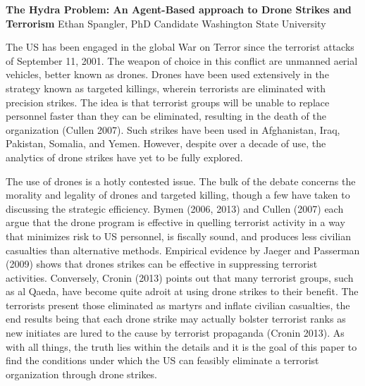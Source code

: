 \documentclass[12pt,letter,draft]{article}
\begin{document}
\clearpage
\thispagestyle{empty}

\noindent \textbf {The Hydra Problem: An Agent-Based approach to Drone Strikes and Terrorism}
\noindent Ethan Spangler, PhD Candidate Washington State University\\
\begin{spacing}{1.5}


The US has been engaged in the global War on Terror since the terrorist attacks of September 11, 2001. The weapon of choice in this conflict are unmanned aerial vehicles, better known as drones. Drones have been used extensively in the strategy known as targeted killings, wherein terrorists are eliminated with precision strikes. The idea is that terrorist groups will be unable to replace personnel faster than they can be eliminated, resulting in the death of the organization (Cullen 2007). Such strikes have been used in Afghanistan, Iraq, Pakistan, Somalia, and Yemen. However, despite over a decade of use, the analytics of drone strikes have yet to be fully explored. 

The use of drones is a hotly contested issue. The bulk of the debate concerns the morality and legality of drones and targeted killing, though a few have taken to discussing the strategic efficiency. Bymen (2006, 2013) and Cullen (2007) each argue that the drone program is effective in quelling terrorist activity in a way that minimizes risk to US personnel, is fiscally sound, and produces less civilian casualties than alternative methods. Empirical evidence by Jaeger and Passerman (2009) shows that drones strikes can be effective in suppressing terrorist activities. Conversely, Cronin (2013) points out that many terrorist groups, such as al Qaeda, have become quite adroit at using drone strikes to their benefit. The terrorists present those eliminated as martyrs and inflate civilian casualties, the end results being that each drone strike may actually bolster terrorist ranks as new initiates are lured to the cause by terrorist propaganda (Cronin 2013). As with all things, the truth lies within the details and it is the goal of this paper to find the conditions under which the US can feasibly eliminate a terrorist organization through drone strikes. 


\end{spacing}
\end{document}
